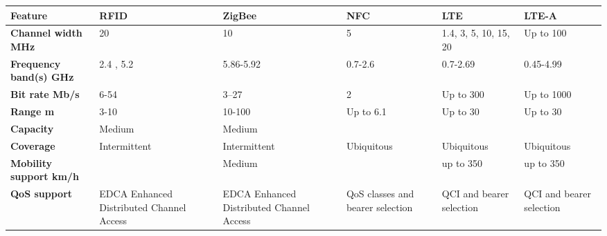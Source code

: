 \begin{table}[h!]
\begin{center}
	\begin{tabulary}{\textwidth}{L|L|L|L|L|L}
	\bf{Feature}                     & \bf{RFID}                                            & \bf{ZigBee}                                          & \bf{NFC}                        & LTE                      & LTE-A                     \\\hline
	\bf{Channel width MHz}           & 20                                                    & 10                                                    & 5                                & 1.4, 3, 5, 10, 15, 20    & Up to 100                 \\\hline
	\bf{Frequency band(s) GHz}       & 2.4 , 5.2                                             & 5.86-5.92                                             & 0.7-2.6                          & 0.7-2.69                 & 0.45-4.99                 \\\hline
	\bf{Bit rate Mb/s}               & 6-54                                                  & 3–27                                                  & 2                                & Up to 300                & Up to 1000                \\\hline
	\bf{Range m}                     & 3-10                                                  & 10-100                                                & Up to 6.1                         & Up to 30                 & Up to 30                  \\\hline
	\bf{Capacity}                    & Medium                                                & Medium                                                & \ko                              & \ok                      & \ok                       \\\hline
	\bf{Coverage}                    & Intermittent                                          & Intermittent                                          & Ubiquitous                       & Ubiquitous               & Ubiquitous                \\\hline
	\bf{Mobility support km/h}       & \ko                                                   & Medium                                                & \ok                              & up to 350                & up to 350                 \\\hline
	\bf{QoS support}                 & EDCA \scriptsize{Enhanced Distributed Channel Access} & EDCA \scriptsize{Enhanced Distributed Channel Access} & QoS classes and bearer selection & QCI and bearer selection & QCI and bearer selection  \\\hline

\end{tabulary}
\end{center}
\end{table}
